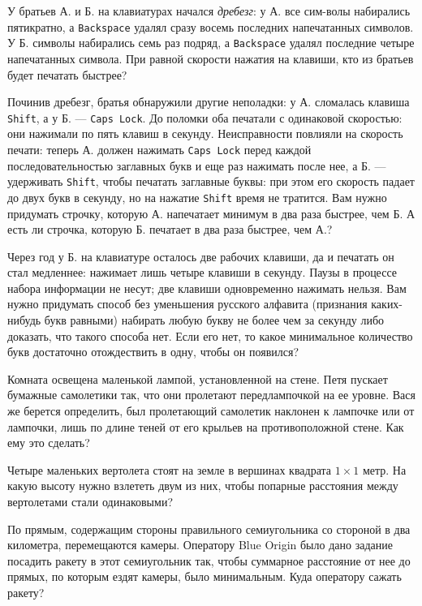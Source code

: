 \begin{itemize}
\itA У братьев А. и Б. на клавиатурах начался {\itshape дребезг}: у А. все сим-\linebreak волы набирались пятикратно, а {\verb!Backspace!} удалял сразу восемь последних напечатанных символов. У Б. символы набирались семь раз подряд, а {\verb!Backspace!} удалял последние четыре напечатанных символа. При равной скорости нажатия на клавиши, кто из братьев будет печатать быстрее?

\itB Починив дребезг, братья обнаружили другие неполадки: у А. сломалась клавиша {\verb!Shift!}, а у Б. — {\verb!Caps Lock!}. До поломки оба печатали с одинаковой скоростью: они нажимали по пять клавиш в секунду. Неисправности повлияли на скорость печати: теперь А. должен нажимать {\verb!Caps Lock!} перед каждой последовательностью заглавных букв и еще раз нажимать после нее, а Б. — удерживать {\verb!Shift!}, чтобы печатать заглавные буквы: при этом его скорость падает до двух букв в секунду, но на нажатие {\verb!Shift!} время не тратится. Вам нужно придумать строчку, которую А. напечатает минимум в два раза быстрее, чем Б. А есть ли строчка, которую Б. печатает в два раза быстрее, чем А.?

\itC Через год у Б. на клавиатуре осталось две рабочих клавиши, да и печатать он стал медленнее: нажимает лишь четыре клавиши в секунду. Паузы в процессе набора информации не несут;  две клавиши одновременно нажимать нельзя. Вам нужно придумать способ без уменьшения русского алфавита (признания каких-нибудь букв равными) набирать любую букву не более чем за секунду либо доказать, что такого способа нет. Если его нет, то какое минимальное количество букв достаточно отождествить в одну, чтобы он появился?
\end{itemize}

\begin{itemize}
\itA Комната освещена маленькой лампой, установленной на стене. Петя пускает бумажные самолетики так, что они пролетают перед\linebreak лампочкой на ее уровне. Вася же берется определить, был пролетающий самолетик наклонен к лампочке или от лампочки, лишь по длине теней от его крыльев на противоположной стене. Как ему это сделать?

\itB Четыре маленьких вертолета стоят на земле в вершинах квадрата $1 \times 1$ метр. На какую высоту нужно взлететь двум из них, чтобы попарные расстояния между вертолетами стали одинаковыми?

\itC По прямым, содержащим стороны правильного семиугольника со стороной в два километра, перемещаются камеры. Оператору Blue Origin было дано задание посадить ракету в этот семиугольник так, чтобы суммарное расстояние от нее до прямых, по которым ездят камеры, было минимальным. Куда оператору сажать ракету?
\end{itemize}

